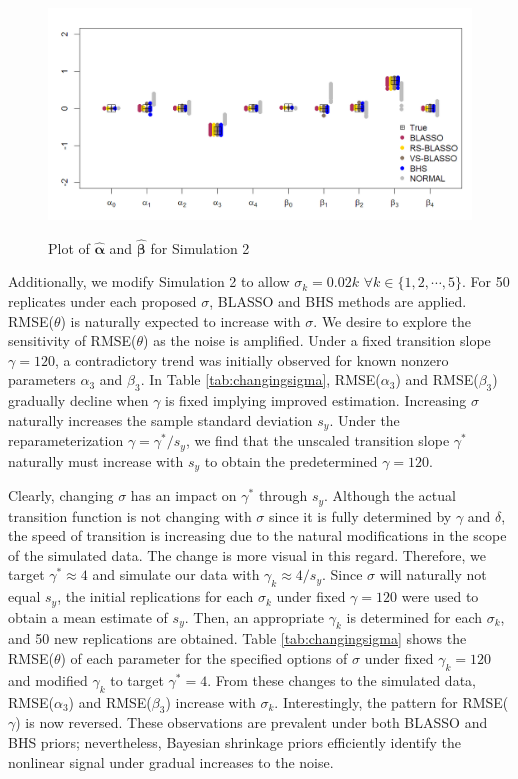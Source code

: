 \begin{figure}[h]
	\centering
	      \caption{Plot of $\hat{\bm{\alpha}}$ and $\hat{\bm{\beta}}$ for Simulation 2}
      \includegraphics[scale=0.35]{blassovsbhs3}
      \label{fig:blvsbh3}
\end{figure}

Additionally, we modify Simulation 2 to allow $\sigma_k=0.02k$ $\forall k \in \{1,2,\cdots, 5\}$. For 50 replicates under each proposed $\sigma$, BLASSO and BHS methods are applied.  RMSE($\theta$) is naturally expected to increase with $\sigma$. We desire to explore the sensitivity of RMSE($\theta$) as the noise is amplified. Under a fixed transition slope $\gamma=120$,  a contradictory trend was initially observed for known nonzero parameters $\alpha_3$ and $\beta_3$.  In Table \ref{tab:changingsigma}, RMSE($\alpha_3$) and RMSE($\beta_3$) gradually decline when $\gamma$ is fixed implying improved estimation. Increasing $\sigma$ naturally increases the sample standard deviation $s_{y}$. Under the reparameterization $\gamma=\gamma^*/s_y$, we find that the unscaled transition slope $\gamma^*$ naturally must increase with $s_y$ to obtain the predetermined $\gamma=120$. 

Clearly, changing $\sigma$ has an impact on $\gamma^*$ through $s_y$. Although the actual transition function is not changing with $\sigma$ since it is fully determined by $\gamma$ and $\delta$, the speed of transition is increasing due to the natural modifications in the scope of the simulated data. The change is more visual in this regard. Therefore, we target $\gamma^*\approx 4$ and simulate our data with $\gamma_k \approx 4/s_y$. Since $\sigma$ will naturally not equal $s_y$, the initial replications for each $\sigma_k$ under fixed $\gamma=120$ were used to obtain a mean estimate of $s_y$. Then, an appropriate $\gamma_k$ is determined for each $\sigma_k$, and 50 new replications are obtained. Table \ref{tab:changingsigma} shows the RMSE($\theta$) of each parameter for the specified options of $\sigma$ under fixed $\gamma_k=120$ and modified $\gamma_k$ to target $\gamma^*=4$. From these changes to the simulated data, RMSE($\alpha_3$) and RMSE($\beta_3$) increase with $\sigma_k$. Interestingly, the pattern for RMSE($\gamma$) is now reversed. These observations are  prevalent under both BLASSO and BHS priors; nevertheless, Bayesian shrinkage priors efficiently identify the nonlinear signal under gradual increases to the noise.




